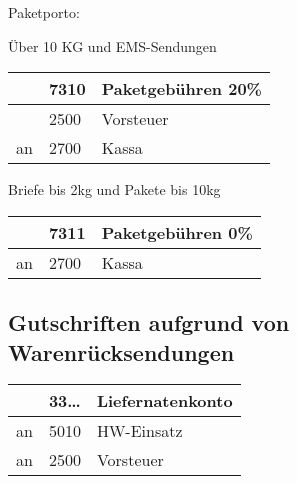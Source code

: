 \documentclass[letterpaper,10pt,english]{sphinxmanual}
\begin{document}
\begin{DUlineblock}{0em}
\item[] Paketporto:
\item[] Über 10 KG und EMS-Sendungen
\end{DUlineblock}


\begin{savenotes}\sphinxattablestart
\centering
\begin{tabulary}{\linewidth}[t]{|T|T|T|}
\hline
&
7310
&
Paketgebühren 20\%
\\
\hline&
2500
&
Vorsteuer
\\
\hline
an
&
2700
&
Kassa
\\
\hline
\end{tabulary}
\par
\sphinxattableend\end{savenotes}

Briefe bis 2kg und Pakete bis 10kg


\begin{savenotes}\sphinxattablestart
\centering
\begin{tabulary}{\linewidth}[t]{|T|T|T|}
\hline
&
7311
&
Paketgebühren 0\%
\\
\hline
an
&
2700
&
Kassa
\\
\hline
\end{tabulary}
\par
\sphinxattableend\end{savenotes}


\subsection{Gutschriften aufgrund von Warenrücksendungen}
\label{\detokenize{pool1:gutschriften-aufgrund-von-warenrucksendungen}}


\begin{savenotes}\sphinxattablestart
\centering
\begin{tabulary}{\linewidth}[t]{|T|T|T|}
\hline
&
33…
&
Liefernatenkonto
\\
\hline
an
&
5010
&
HW-Einsatz
\\
\hline
an
&
2500
&
Vorsteuer
\\
\hline
\end{tabulary}
\par
\sphinxattableend\end{savenotes}

\end{document}
